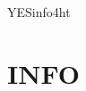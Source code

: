 
\ifx \HTML\UnDef
   \def\HTML{info4ht}
   \def\CONFIG{\jobname}
   \def\MAKETITLE{\author{Eitan M. Gurari}}
   \def\next{   \endinput}
   \expandafter\next
\fi




\expandafter\ifx \csname YES\HTML\endcsname\relax
\else
    \def\CleanComment#1tex4ht-info#2#3#4.#5>#6//{[#4%
                  \if,\ifnum \FIRST=#6 .\else ,0\fi\fi]#6//}
\fi


\chapter{INFO}


